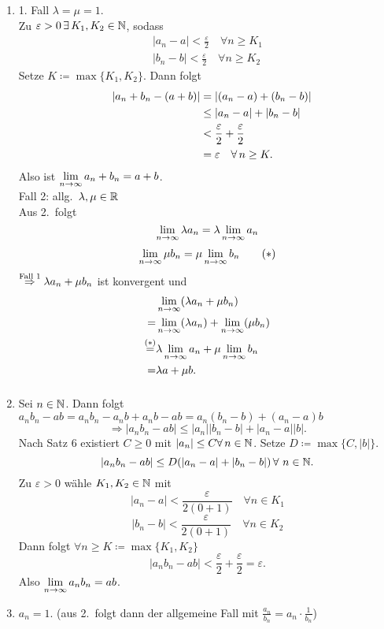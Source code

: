 \documentclass[../ana1.tex]{subfiles}
\begin{document}
\begin{bew}\leavevmode
	\begin{enumerate}
		\item 1. Fall \(\lambda = \mu = 1\).\\
		Zu \(\varepsilon>0 \,\exists K_1, K_2 \in\N \), sodass
		\begin{align*}
			|a_n-a|<\frac{\varepsilon}{2} \quad \forall n\geq K_1\\
			|b_n-b|<\frac{\varepsilon}{2} \quad \forall n\geq K_2
		\end{align*}
		Setze \(K \coloneqq \max \{K_1, K_2\} \). Dann folgt 
		\begin{align*}
			\hphantom{=} |a_n + b_n - (a+b)| 
			&= |(a_n-a)+(b_n-b)| \\
			&\leq |a_n-a|+|b_n-b| \\
			&< \frac{\varepsilon}{2} + \frac{\varepsilon}{2} \\
			&= \varepsilon \quad \forall n\geq K.
		\end{align*}
		Also ist \(\lim\limits_{n\rightarrow\infty}a_n+b_n=a+b\).\\
		Fall 2: allg.\  \(\lambda,\mu\in\mathbb{R} \) \\
		Aus 2.\ folgt 
		\[\lim\limits_{n\rightarrow\infty} \lambda a_n = \lambda \lim\limits_{n\rightarrow\infty} a_n\]
		\[\lim\limits_{n\rightarrow\infty} \mu b_n = \mu \lim\limits_{n\rightarrow\infty} b_n \tag{\(*\)} \]
		\(\overset{\text{Fall 1}}{\Rightarrow} \lambda a_n + \mu b_n\) ist konvergent und 
		\begin{align*}
			&\lim\limits_{n\rightarrow\infty} (\lambda a_n + \mu b_n) \\
			= &\lim\limits_{n\rightarrow\infty} (\lambda a_n) + \lim\limits_{n\rightarrow\infty} (\mu b_n) \\
			\overset{(*)}{=} &\lambda \lim\limits_{n\rightarrow\infty} a_n + \mu \lim\limits_{n\rightarrow\infty} b_n \\
			= &\lambda a + \mu b.
		\end{align*}
		\[\]
		\item Sei \(n\in\mathbb{N} \). Dann folgt \(a_n b_n-ab = a_n b_n -a_n b + a_n b - ab=a_n(b_n-b)+(a_n-a)b\)
		\[\Rightarrow |a_n b_n -ab|\leq |a_n| |b_n-b| + |a_n-a||b|.\]
		Nach Satz 6 existiert \(C\geq 0\) mit \(|a_n|\leq C \forall n\in\N \). Setze \(D\coloneqq \max \{C, |b|\} \).
		\[|a_n b_n - ab| \leq D(|a_n-a|+|b_n-b|) \,\forall \, n\in\N.\]
		Zu \(\varepsilon > 0\) wähle \(K_1,K_2\in\mathbb{N} \) mit 
		\[|a_n-a|<\frac{\varepsilon}{2(0+1)} \quad \forall n\in K_1\]
		\[|b_n-b|<\frac{\varepsilon}{2(0+1)} \quad \forall n\in K_2\]
		Dann folgt \(\forall n\geq K \coloneqq \max \{K_1, K_2\} \)
		\[|a_n b_n - ab|<\frac{\varepsilon}{2} + \frac{\varepsilon}{2} = \varepsilon.\]
		Also \(\lim\limits_{n\rightarrow\infty} a_n b_n = ab\).
		\item \Obda{} \(a_n = 1\). (aus 2.\ folgt dann der allgemeine Fall mit \( \frac{a_n}{b_n} = a_n \cdot\frac{1}{b_n} \))\\

\end{enumerate}
\end{bew}
\end{document}
